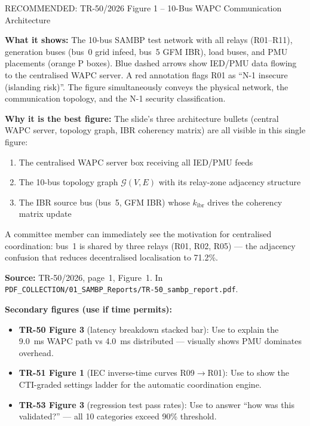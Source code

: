 \documentclass[12pt,a4paper]{article}
\newcommand{\kibr}{k_\mathrm{ibr}}
\begin{document}
\begin{resultbox}{RECOMMENDED: TR-50/2026 Figure 1 -- 10-Bus WAPC Communication Architecture}

\textbf{What it shows:} The 10-bus SAMBP test network with all relays (R01--R11), generation buses (bus~0 grid infeed, bus~5 GFM IBR), load buses, and PMU placements (orange P boxes). Blue dashed arrows show IED/PMU data flowing to the centralised WAPC server. A red annotation flags R01 as ``N-1 insecure (islanding risk)''. The figure simultaneously conveys the physical network, the communication topology, and the N-1 security classification.

\textbf{Why it is the best figure:} The slide's three architecture bullets (central WAPC server, topology graph, IBR coherency matrix) are all visible in this single figure:
\begin{enumerate}[nosep]
  \item The centralised WAPC server box receiving all IED/PMU feeds
  \item The 10-bus topology graph $\mathcal{G}(V, E)$ with its relay-zone adjacency structure
  \item The IBR source bus (bus~5, GFM IBR) whose $\kibr$ drives the coherency matrix update
\end{enumerate}
A committee member can immediately see the motivation for centralised coordination: bus~1 is shared by three relays (R01, R02, R05) — the adjacency confusion that reduces decentralised localisation to 71.2\%.

\textbf{Source:} TR-50/2026, page~1, Figure~1. In \texttt{PDF\_COLLECTION/01\_SAMBP\_Reports/TR-50\_sambp\_report.pdf}.
\end{resultbox}

\textbf{Secondary figures (use if time permits):}
\begin{itemize}[nosep]
  \item \textbf{TR-50 Figure 3} (latency breakdown stacked bar): Use to explain the 9.0~ms WAPC path vs 4.0~ms distributed — visually shows PMU dominates overhead.
  \item \textbf{TR-51 Figure 1} (IEC inverse-time curves R09$\to$R01): Use to show the CTI-graded settings ladder for the automatic coordination engine.
  \item \textbf{TR-53 Figure 3} (regression test pass rates): Use to answer ``how was this validated?'' — all 10 categories exceed 90\% threshold.
\end{itemize}

\end{document}
